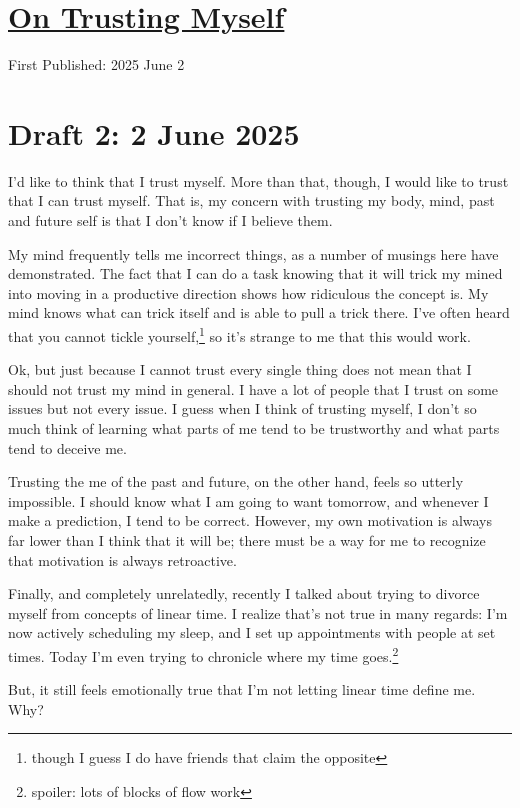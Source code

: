 \documentclass[12pt]{article}
\renewcommand{\,}{\textsuperscript{,}}
\begin{document}
  
\doublespacing  
\section{\href{trusting-myself.html}{On Trusting Myself}}  
First Published: 2025 June 2

\section{Draft 2: 2 June 2025}

I'd like to think that I trust myself.  
More than that, though, I would like to trust that I can trust myself.  
That is, my concern with trusting my body, mind, past and future self is that I don't know if I believe them.

My mind frequently tells me incorrect things, as a number of musings here have demonstrated.  
The fact that I can do a task knowing that it will trick my mined into moving in a productive direction shows how ridiculous the concept is.  
My mind knows what can trick itself and is able to pull a trick there.  
I've often heard that you cannot tickle yourself,\footnote{though I guess I do have friends that claim the opposite} so it's strange to me that this would work.

Ok, but just because I cannot trust every single thing does not mean that I should not trust my mind in general.  
I have a lot of people that I trust on some issues but not every issue.  
I guess when I think of trusting myself, I don't so much think of learning what parts of me tend to be trustworthy and what parts tend to deceive me.

Trusting the me of the past and future, on the other hand, feels so utterly impossible.  
I should know what I am going to want tomorrow, and whenever I make a prediction, I tend to be correct.  
However, my own motivation is always far lower than I think that it will be; there must be a way for me to recognize that motivation is always retroactive.

Finally, and completely unrelatedly, recently I talked about trying to divorce myself from concepts of linear time.  
I realize that's not true in many regards: I'm now actively scheduling my sleep, and I set up appointments with people at set times.  
Today I'm even trying to chronicle where my time goes.\footnote{spoiler: lots of blocks of flow work}

But, it still feels emotionally true that I'm not letting linear time define me.  
Why?
\end{document}
